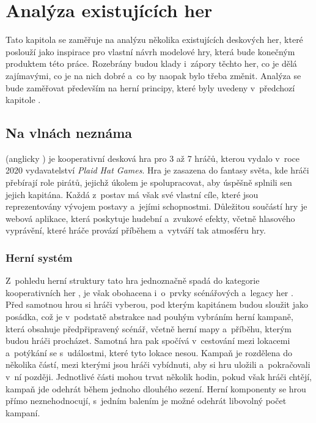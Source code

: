 \chapter{Analýza existujících her}
\label{chap:game_analysis}

Tato kapitola se zaměřuje na analýzu několika existujících deskových her, které poslouží jako inspirace pro vlastní návrh modelové hry, která bude konečným produktem této práce. Rozebrány budou klady i~zápory těchto her, co je dělá zajímavými, co je na nich dobré a~co by naopak bylo třeba změnit. Analýza se bude zaměřovat především na herní principy, které byly uvedeny v~předchozí kapitole .



\section{Na vlnách neznáma}
\label{sec:forgotten_waters}

 (anglicky ) je kooperativní desková hra pro 3 až 7 hráčů, kterou vydalo v~roce 2020 vydavatelství \textit{Plaid Hat Games}. Hra je zasazena do fantasy světa, kde hráči přebírají role pirátů, jejichž úkolem je spolupracovat, aby úspěšně splnili sen jejich kapitána. Každá z~postav má však své vlastní cíle, které jsou reprezentovány vývojem postavy a~jejími schopnostmi. Důležitou součástí hry je webová aplikace, která poskytuje hudební a~zvukové efekty, včetně hlasového vyprávění, které hráče provází příběhem a~vytváří tak atmosféru hry. \cite{forgotten_waters}


\subsection{Herní systém}
\label{subsec:fw_gameplay}

Z~pohledu herní struktury tato hra jednoznačně spadá do kategorie kooperativních her , je však obohacena i~o~prvky scénářových  a~legacy her . Před samotnou hrou si hráči vyberou, pod kterým kapitánem budou sloužit jako posádka, což je v~podstatě abstrakce nad pouhým vybráním herní kampaně, která obsahuje předpřipravený scénář, včetně herní mapy a~příběhu, kterým budou hráči procházet. Samotná hra pak spočívá v~cestování mezi lokacemi a~potýkání se s~událostmi, které tyto lokace nesou. Kampaň je rozdělena do několika částí, mezi kterými jsou hráči vybídnuti, aby si hru uložili a~pokračovali v~ní později. Jednotlivé části mohou trvat několik hodin, pokud však hráči chtějí, kampaň jde odehrát během jednoho dlouhého sezení. Herní komponenty se hrou přímo neznehodnocují, s~jedním balením je možné odehrát libovolný počet kampaní.

